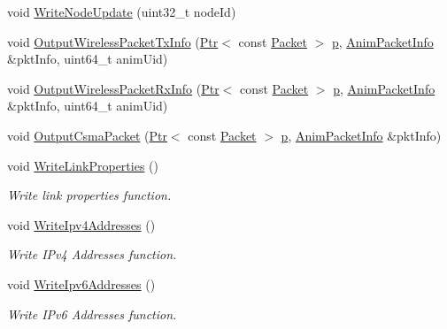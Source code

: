 \begin{DoxyCompactItemize}
\item 
void \hyperlink{classns3_1_1AnimationInterface_ada8cab26c8822c0100abb1ac26b1a0d5}{Write\+Node\+Update} (uint32\+\_\+t node\+Id)
\item 
void \hyperlink{classns3_1_1AnimationInterface_a473fae6007101c1b553231084eff90b3}{Output\+Wireless\+Packet\+Tx\+Info} (\hyperlink{classns3_1_1Ptr}{Ptr}$<$ const \hyperlink{classns3_1_1Packet}{Packet} $>$ \hyperlink{lte__link__budget__x2__handover__measures_8m_ac9de518908a968428863f829398a4e62}{p}, \hyperlink{classns3_1_1AnimationInterface_1_1AnimPacketInfo}{Anim\+Packet\+Info} \&pkt\+Info, uint64\+\_\+t anim\+Uid)
\item 
void \hyperlink{classns3_1_1AnimationInterface_ae7dbb6c566787d3444e3fcba367e5338}{Output\+Wireless\+Packet\+Rx\+Info} (\hyperlink{classns3_1_1Ptr}{Ptr}$<$ const \hyperlink{classns3_1_1Packet}{Packet} $>$ \hyperlink{lte__link__budget__x2__handover__measures_8m_ac9de518908a968428863f829398a4e62}{p}, \hyperlink{classns3_1_1AnimationInterface_1_1AnimPacketInfo}{Anim\+Packet\+Info} \&pkt\+Info, uint64\+\_\+t anim\+Uid)
\item 
void \hyperlink{classns3_1_1AnimationInterface_a17b147520da418eaf7b892624589f160}{Output\+Csma\+Packet} (\hyperlink{classns3_1_1Ptr}{Ptr}$<$ const \hyperlink{classns3_1_1Packet}{Packet} $>$ \hyperlink{lte__link__budget__x2__handover__measures_8m_ac9de518908a968428863f829398a4e62}{p}, \hyperlink{classns3_1_1AnimationInterface_1_1AnimPacketInfo}{Anim\+Packet\+Info} \&pkt\+Info)
\item 
void \hyperlink{classns3_1_1AnimationInterface_a458296bfceb6bd8b53b4c9bf38b5fdc7}{Write\+Link\+Properties} ()
\begin{DoxyCompactList}\small\item\em Write link properties function. \end{DoxyCompactList}\item 
void \hyperlink{classns3_1_1AnimationInterface_a45b100b1e083fb646479c09448177afa}{Write\+Ipv4\+Addresses} ()
\begin{DoxyCompactList}\small\item\em Write I\+Pv4 Addresses function. \end{DoxyCompactList}\item 
void \hyperlink{classns3_1_1AnimationInterface_ab7d08c1871c6b1c2858d3d536bbdcee2}{Write\+Ipv6\+Addresses} ()
\begin{DoxyCompactList}\small\item\em Write I\+Pv6 Addresses function. \end{DoxyCompactList}\item 

\end{DoxyCompactItemize}
